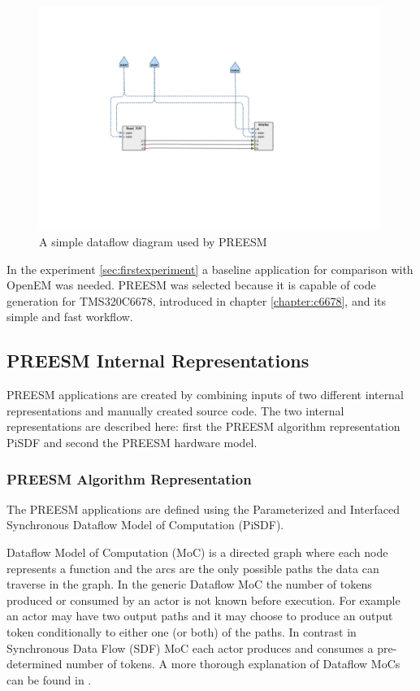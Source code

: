 \begin{figure}[h!]
    \begin{center}
        \includegraphics[width=0.99\textwidth]{images/example_preesm_diagram.png}
        \caption{A simple dataflow diagram used by PREESM }
        \label{fig:preesm_example}
    \end{center}
\end{figure}

In the experiment \ref{sec:firstexperiment} a baseline application for comparison with OpenEM was needed. PREESM was selected because it is capable of code generation for TMS320C6678, introduced in chapter \ref{chapter:c6678}, and its simple and fast workflow.

\subsection{PREESM Internal Representations}
\label{sec:dataflow}
PREESM applications are created by combining inputs of two different internal representations and manually created source code. The two internal representations are described here: first the PREESM algorithm representation PiSDF and second the PREESM hardware model.

\subsubsection{PREESM Algorithm Representation}
The PREESM applications are defined using the Parameterized and Interfaced Synchronous Dataflow Model of Computation (PiSDF)\cite{pelcat2014preesm}. 

Dataflow Model of Computation (MoC) is a directed graph where each node represents a function and the arcs are the only possible paths the data can traverse in the graph. In the generic Dataflow MoC the number of tokens produced or consumed by an actor is not known before execution. For example an actor may have two output paths and it may choose to produce an output token conditionally to either one (or both) of the paths. In contrast in Synchronous Data Flow (SDF) MoC each actor produces and consumes a pre-determined number of tokens. \cite{lee1987synchronous} A more thorough explanation of Dataflow MoCs can be found in \cite{lee2015introduction}.


